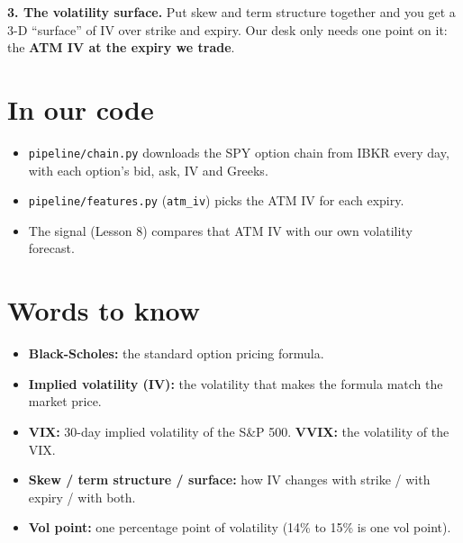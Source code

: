 \documentclass{article}
\begin{document}
\textbf{3. The volatility surface.} Put skew and term structure together and you get a 3-D ``surface'' of IV over strike and expiry. Our desk only needs one point on it: the \textbf{ATM IV at the expiry we trade}.

\section{In our code}

\begin{itemize}

\item \texttt{pipeline/\allowbreak{}chain.\allowbreak{}py} downloads the SPY option chain from IBKR every day, with each option's bid, ask, IV and Greeks.

\item \texttt{pipeline/\allowbreak{}features.\allowbreak{}py} (\texttt{atm\_\allowbreak{}iv}) picks the ATM IV for each expiry.

\item The signal (Lesson 8) compares that ATM IV with our own volatility forecast.

\end{itemize}

\section{Words to know}

\begin{itemize}

\item \textbf{Black-Scholes:} the standard option pricing formula.

\item \textbf{Implied volatility (IV):} the volatility that makes the formula match the market price.

\item \textbf{VIX:} 30-day implied volatility of the S\&P 500. \textbf{VVIX:} the volatility of the VIX.

\item \textbf{Skew /\allowbreak{} term structure /\allowbreak{} surface:} how IV changes with strike /\allowbreak{} with expiry /\allowbreak{} with both.

\item \textbf{Vol point:} one percentage point of volatility (14\% to 15\% is one vol point).

\end{itemize}
\end{document}
